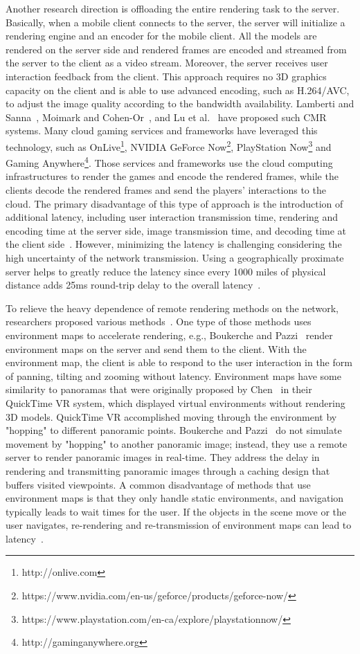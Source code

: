 Another research direction is offloading the entire rendering task to the server. Basically, when a mobile client connects to the server, the server will initialize a rendering engine and an encoder for the mobile client. All the models are rendered on the server side and rendered frames are encoded and streamed from the server to the client as a video stream. Moreover, the server receives user interaction feedback from the client. This approach requires no 3D graphics capacity on the client and is able to use advanced encoding, such as H.264/AVC, to adjust the image quality according to the bandwidth availability.
Lamberti and Sanna~\cite{lamberti2007}, Moimark and Cohen-Or~\cite{noimark2003}, and Lu et al.~\cite{lu2011} have proposed such CMR systems.
Many cloud gaming services and frameworks have leveraged this technology, such as OnLive\footnote{http://onlive.com}, NVIDIA GeForce Now\footnote{https://www.nvidia.com/en-us/geforce/products/geforce-now/}, PlayStation Now\footnote{https://www.playstation.com/en-ca/explore/playstationnow/} and Gaming Anywhere\footnote{http://gaminganywhere.org}. Those services and frameworks use the cloud computing infrastructures to render the games and encode the rendered frames, while the clients decode the rendered frames and send the players' interactions to the cloud.
The primary disadvantage of this type of approach is the introduction of additional latency, including user interaction transmission time, rendering and encoding time at the server side, image transmission time, and decoding time at the client side~\cite{shi2015}. However, minimizing the latency is challenging considering the high uncertainty of the network transmission. Using a geographically proximate server helps to greatly reduce the latency since every 1000 miles of physical distance adds 25ms round-trip delay to the overall latency~\cite{perlman2010}.

To relieve the heavy dependence of remote rendering methods on the network, researchers proposed various methods~\cite{paravati2010,liang2009,yang2013}. One type of those methods uses environment maps to accelerate rendering, e.g., 
Boukerche and Pazzi~\cite{boukerche2006} render environment maps on the server and send them to the client. With the environment map, the client is able to respond to the user interaction in the form of panning, tilting and zooming without latency. Environment maps have some similarity to panoramas that were originally proposed by Chen~\cite{chen1995} in their QuickTime VR system, which displayed virtual environments without rendering 3D models.
QuickTime VR accomplished moving through the environment by "hopping" to different panoramic points.
Boukerche and Pazzi~\cite{boukerche2006} do not simulate movement by "hopping" to another panoramic image; instead, they use a remote server to render panoramic images in real-time. They address the delay in rendering and transmitting panoramic images through a caching design that buffers visited viewpoints.
A common disadvantage of methods that use environment maps is that they only handle static environments, and navigation typically leads to wait times for the user. If the objects in the scene move or the user navigates, re-rendering and re-transmission of environment maps can lead to latency~\cite{macchiavello2014,quax2016}.

